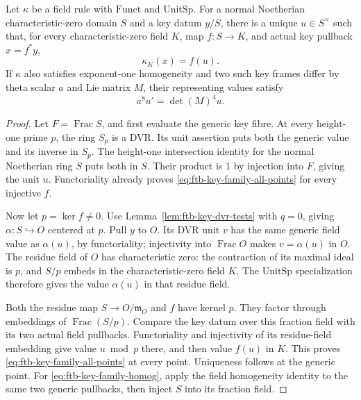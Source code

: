 \begin{srproposition}
\label{prop:ftb-key-family-unit}
Let \(\kappa\) be a field rule with
\(\mathrm{Funct}\) and \(\mathrm{UnitSp}\).
For a normal Noetherian characteristic-zero domain \(S\)
and a key datum \(y/S\), there is a unique \(u\in S^\times\)
such that, for every characteristic-zero field \(K\), map
\(f:S\to K\), and actual key pullback \(x=f^*y\),
\[
                                      \kappa_K(x)=f(u).
 \tag{U2}\label{eq:ftb-key-family-all-points}
\]
If \(\kappa\) also satisfies exponent-one homogeneity and
two such key frames differ by theta scalar \(a\) and
Lie matrix \(M\), their representing values satisfy
\[
                                  a^8u'=\det(M)^4u.
 \tag{U3}\label{eq:ftb-key-family-homog}
\]
\end{srproposition}
\begin{proof}
Let \(F=\operatorname{Frac}S\), and first evaluate the
generic key fibre.
At every height-one prime \(p\), the ring \(S_p\) is a DVR.
Its unit assertion puts both the generic value and its
inverse in \(S_p\).
The height-one intersection identity for the normal
Noetherian ring \(S\) puts both in \(S\).
Their product is \(1\) by injection into \(F\), giving
the unit \(u\).
Functoriality already proves
\eqref{eq:ftb-key-family-all-points} for every injective \(f\).

Now let \(p=\ker f\ne0\).
Use Lemma~\ref{lem:ftb-key-dvr-tests} with \(q=0\), giving
\(\alpha:S\hookrightarrow O\) centered at \(p\).
Pull \(y\) to \(O\).
Its DVR unit \(v\) has the same generic field value as
\(\alpha(u)\), by functoriality; injectivity into
\(\operatorname{Frac}O\) makes \(v=\alpha(u)\) in \(O\).
The residue field of \(O\) has characteristic zero:
the contraction of its maximal ideal is \(p\), and
\(S/p\) embeds in the characteristic-zero field \(K\).
The \(\mathrm{UnitSp}\) specialization therefore gives
the value \(\overline{\alpha(u)}\) in that residue field.

Both the residue map \(S\to O/\mathfrak m_O\) and \(f\)
have kernel \(p\).
They factor through embeddings of
\(\operatorname{Frac}(S/p)\).
Compare the key datum over this fraction field with its
two actual field pullbacks.
Functoriality and injectivity of its residue-field
embedding give value \(u\bmod p\) there, and then value
\(f(u)\) in \(K\).
This proves \eqref{eq:ftb-key-family-all-points} at every
point.  Uniqueness follows at the generic point.
For \eqref{eq:ftb-key-family-homog}, apply the field
homogeneity identity to the same two generic pullbacks,
then inject \(S\) into its fraction field.
\end{proof}

